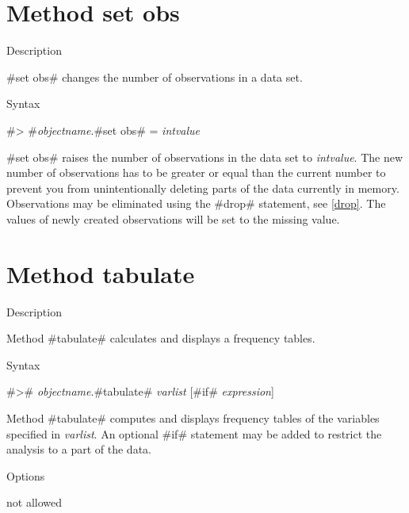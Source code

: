 \clearpage



\section{Method set obs}
\label{setobs}


\begin{stanza}{Description}

{#set obs# changes the number of observations in a data set.}
\end{stanza}


\begin{stanza}{Syntax}

#> #{\em objectname}.#set obs# = {\em intvalue}

#set obs# raises the number of observations in the data set to
{\em intvalue}. The new number of observations has to be greater
or equal than the current number to prevent you from
unintentionally deleting parts of the data currently in memory.
Observations may be eliminated using the #drop# statement, see
\autoref{drop}. The values of newly created observations will be
set to the missing value.
\end{stanza}



\clearpage



\section{Method tabulate}
\label{tabulate}  
 

\begin{stanza}{Description}

Method #tabulate# calculates and displays a frequency tables.
\end{stanza}

\begin{stanza}{Syntax}

#># {\em objectname}.#tabulate# {\em varlist} [#if# {\em
expression}]

Method #tabulate# computes and displays frequency tables of the
variables specified in {\em varlist}. An optional #if# statement
may be added to restrict the analysis to a part of the data.
\end{stanza}

\begin{stanza}{Options}

not allowed
\end{stanza}

